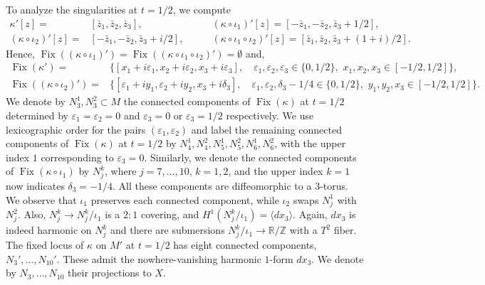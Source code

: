 \documentclass[10pt]{article}
\renewcommand{\d}{\delta}
\newcommand{\e}{\varepsilon}
\newcommand{\R}{\mathbb R}
\newcommand{\Z}{\mathbb Z}
\newcommand{\la}{\langle}
\newcommand{\ra}{\rangle}
\newcommand{\Fix}{\operatorname{Fix}}
\theoremstyle{plain}
\theoremstyle{definition}
\theoremstyle{remark}
\begin{document}
To analyze the singularities at $t=1/2$, we compute
\begin{align*}
\kappa' [z]=&[\bar{z}_1,\bar{z}_2,\bar{z}_3], \qquad \qquad 
&(\kappa\circ \iota_1)' [z]=[-\bar{z}_1,-\bar{z}_2,\bar{z}_3 + 1/2], \\
(\kappa\circ \iota_2)' [z]=&[-\bar{z}_1,-\bar{z}_2,\bar{z}_3 + i/2], \qquad 
&(\kappa\circ \iota_1 \circ \iota_2)' [z]= [\bar{z}_1,\bar{z}_2,\bar{z}_3 + (1+i)/2].
\end{align*}
Hence, $\Fix((\kappa \circ \iota_1)')=\Fix((\kappa \circ \iota_1\circ \iota_2)')=\emptyset$ and,
\begin{align}
\Fix(\kappa')=&\{ [x_1+ i\e_1, x_2+ i\e_2, x_3 + i\e_3 ], \quad \e_1,\e_2, \e_3 \in \{0,1/2\}, \,\,  x_1,x_2,x_3\in [-1/2,1/2] \} , \label{eqn:N3-6}\\
\Fix((\kappa\circ \iota_2)')=&\{ [\e_1+ iy_1, \e_2+iy_2, x_3 + i\delta_3], \quad \e_1,\e_2, \d_3-1/4 \in \{0,1/2\}, \,\,  y_1,y_2,x_3\in [-1/2,1/2] \}.\label{eqn:N7-10}
\end{align}
We denote by $N_3^1,N_3^2 \subset M$ the connected components of $\Fix(\kappa)$ at $t=1/2$ determined by $\e_1=\e_2=0$ and $\e_3=0$ or $\e_3=1/2$ respectively. We use lexicographic order for the pairs 
$(\e_1,\e_2)$ and label the remaining connected components of $\Fix(\kappa)$ at $t=1/2$ by $N_4^1,N_4^2,N_5^1,N_5^2,N_6^1,N_6^2$,
with the upper index $1$ corresponding to 
$\e_3=0$. Similarly, we denote the connected components of $\Fix(\kappa \circ \iota_1)$ by $N_j^k$, where $j=7,\dots,10$, $k=1,2$, and the upper index $k=1$ now indicates $\delta_3=-1/4$. All these components are diffeomorphic to a $3$-torus.
We observe that $\iota_1$  preserves each connected component, while $\iota_2$ 
swaps $N_j^1$ with $N_j^2$. Also, $N_j^k \to N_j^k/ \iota_1 $ is a $2:1$ covering, and $H^1(N_j^k/\iota_1)=\la dx_3\ra$. Again, $dx_3$ is indeed harmonic on $N_j^k$ and there are submersions $N_j^k/\iota_1 \to \R/\Z$ with a $T^2$ fiber.
The fixed locus of $\kappa$ on $M'$ at $t=1/2$ has eight connected components, $N_3',\dots, N_{10}'$. These admit the nowhere-vanishing harmonic $1$-form $dx_3$. We denote by $N_3,\dots, N_{10}$ their projections to $X$.
\end{document}
